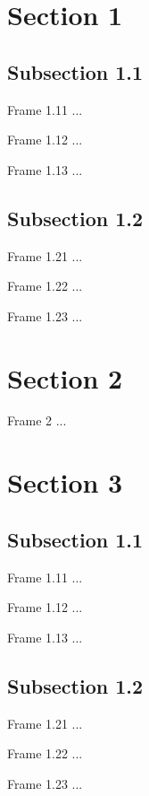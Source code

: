 \documentclass[compress]{beamer}
\let\oldsection\section
\renewcommand{\section}[1]{\oldsection{#1}\label{sec:\thesection}}
\begin{document}
\section{Section 1}
\subsection{Subsection 1.1}
\begin{frame}{Frame 1.11}
...
\end{frame}
\begin{frame}{Frame 1.12}
...
\end{frame}
\begin{frame}{Frame 1.13}
...
\end{frame}
\subsection{Subsection 1.2}
\begin{frame}{Frame 1.21}
...
\end{frame}
\begin{frame}{Frame 1.22}
...
\end{frame}
\begin{frame}{Frame 1.23}
...
\end{frame}

\section{Section 2}
\begin{frame}{Frame 2}
...
\end{frame}

\section{Section 3}

\subsection{Subsection 1.1}
\begin{frame}{Frame 1.11}
...
\end{frame}
\begin{frame}{Frame 1.12}
...
\end{frame}
\begin{frame}{Frame 1.13}
...
\end{frame}
\subsection{Subsection 1.2}
\begin{frame}{Frame 1.21}
...
\end{frame}
\begin{frame}{Frame 1.22}
...
\end{frame}
\begin{frame}{Frame 1.23}
...
\end{frame}
\end{document}
